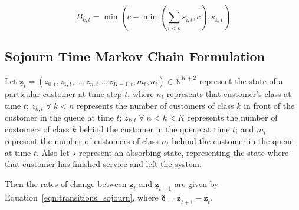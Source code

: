 \documentclass{article}
\begin{document}
\begin{equation}\label{eqn:inservice}
B_{k,t} =\min\left(c - \min\left(\sum_{i < k} s_{i,t}, c\right), s_{k,t}\right)
\end{equation}




\subsection{Sojourn Time Markov Chain Formulation}\label{sec:sojourn_formulation}
Let $\underline{\mathbf{z}}_t = (z_{0,t}, z_{1,t}, \dots, z_{n,t} \dots, z_{K-1,t}, m_t, n_t) \in \mathbb{N}^{K+2}$
represent the state of a particular customer at time step $t$, where $n_t$
represents that customer's class at time $t$; $z_{k,t} \; \forall \; k < n$
represents the number of customers of class $k$ in front of the customer in the
queue at time $t$; $z_{k,t} \; \forall \; n < k < K$ represents the number of
customers of class $k$ behind the customer in the queue at time $t$; and $m_t$
represent the number of customers of class $n_t$ behind the customer in the
queue at time $t$.
Also let $\star$ represent an absorbing state, representing the state where that
customer has finished service and left the system.

Then the rates of change between $\underline{\mathbf{z}}_t$ and
$\underline{\mathbf{z}}_{t+1}$ are given by Equation~\ref{eqn:transitions_sojourn},
where $\underline{\mathbf{\delta}} = \underline{\mathbf{z}}_{t+1} - \underline{\mathbf{z}}_t$,
\end{document}
